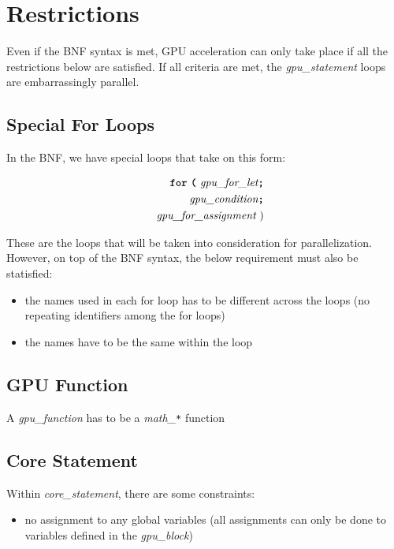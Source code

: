 \section*{Restrictions}

Even if the BNF syntax is met, GPU acceleration can only take place if all the restrictions below are satisfied. If all criteria are met, the \textit{gpu\_statement} loops are embarrassingly parallel.

\subsection*{Special For Loops}

In the BNF, we have special loops that take on this form:

\begin{alignat*}{9}
&& \textbf{\texttt{for}}\ \textbf{\texttt{(}} 
                          \ \textit{gpu\_for\_let} \textbf{\texttt{;}} \\
&& \ \ \textit{gpu\_condition} \textbf{\texttt{;}} \\
&& \textit{gpu\_for\_assignment} \ )
\end{alignat*}

These are the loops that will be taken into consideration for parallelization. However, on top of the BNF syntax, the below requirement must also be statisfied:

\begin{itemize}
    \item{the names used in each for loop has to be different across the loops (no repeating identifiers among the for loops)}
    \item{the names have to be the same within the loop}
\end{itemize}

\subsection*{GPU Function}

A \textit{gpu\_function} has to be a \textit{math\_\texttt{*}} function

\subsection*{Core Statement}

Within \textit{core\_statement}, there are some constraints:

\begin{itemize}
    \item{no assignment to any global variables (all assignments can only be done to variables defined in the \textit{gpu\_block}})
\end{itemize}

